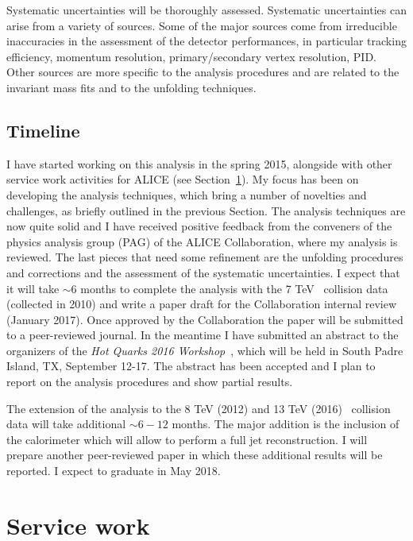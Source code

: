 \documentclass[12pt, a4paper, twoside, titlepage]{article}
\begin{document}
Systematic uncertainties will be thoroughly assessed. Systematic uncertainties can arise from a variety of sources.
Some of the major sources come from irreducible inaccuracies in the assessment of the detector performances, in particular tracking efficiency, 
momentum resolution, primary/secondary vertex resolution, PID.
Other sources are more specific to the analysis procedures and are related to the invariant mass fits and to the unfolding techniques.

\subsection{Timeline}
I have started working on this analysis in the spring 2015, alongside with other service work activities for ALICE (see Section~\ref{sect:ServiceWork}).
My focus has been on developing the analysis techniques, which bring a number of novelties and challenges, as briefly outlined in the previous Section.
The analysis techniques are now quite solid and I have received positive feedback from the conveners of the physics analysis group (PAG) of the ALICE Collaboration,
where my analysis is reviewed. The last pieces that need some refinement are the unfolding procedures and corrections and the assessment of the systematic uncertainties.
I expect that it will take $\sim 6$ months to complete the analysis with the 7 TeV \pp\ collision data (collected in 2010) and write a paper draft for the Collaboration internal review (January 2017). Once approved
by the Collaboration the paper will be submitted to a peer-reviewed journal.
In the meantime I have submitted an abstract to the organizers of the \emph{Hot Quarks 2016 Workshop}~\cite{HotQuarks:2016}, which will be held in South Padre Island, TX, September 12-17. 
The abstract has been accepted and I plan to report on the analysis procedures and show partial results.

The extension of the analysis to the 8 TeV (2012) and 13 TeV (2016) \pp\ collision data will take additional $\sim 6-12$ months. The major addition is the inclusion of the calorimeter
which will allow to perform a full jet reconstruction.
I will prepare another peer-reviewed paper in which these additional results will be reported.
I expect to graduate in May 2018.

\section{Service work}
\label{sect:ServiceWork}
\end{document}
